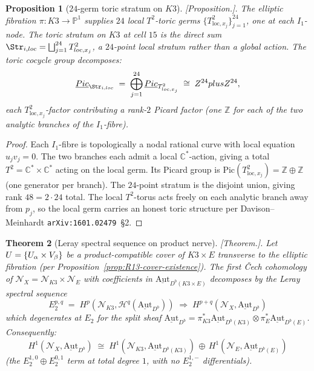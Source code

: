 \documentclass[11pt]{amsart}
\newtheorem{theorem}{Theorem}[section]
\newtheorem{proposition}[theorem]{Proposition}
\providecommand{\C}{\mathbb{C}}
\providecommand{\Z}{\mathbb{Z}}
\providecommand{\Aut}{\mathrm{Aut}}
\providecommand{\Pic}{\mathrm{Pic}}
\providecommand{\cN}{\mathcal{N}}
\providecommand{\cH}{\mathcal{H}}
\providecommand{\ClaimStatusProposition}{[\emph{Proposition.}]}
\providecommand{\ClaimStatusTheorem}{[\emph{Theorem.}]}
\begin{document}
\begin{proposition}[$24$-germ toric stratum on $K3$]
\label{prop:R13-24-germ-stratum}
\ClaimStatusProposition.
The elliptic fibration $\pi: K3 \to \mathbb{P}^1$ supplies $24$ local
$T^2$-toric germs $\{T^2_{\mathrm{loc}, x_j}\}_{j=1}^{24}$, one at each
$I_1$-node. The toric stratum on $K3$ at cell $15$ is the direct sum
$\Str_{i, \mathrm{loc}} = \bigsqcup_{j=1}^{24} T^2_{\mathrm{loc}, x_j}$,
a $24$-point local stratum rather than a global action. The toric
cocycle group decomposes:
\[
  \underline{\Pic}_{\Str_{i, \mathrm{loc}}}
  \;=\; \bigoplus_{j=1}^{24}
  \underline{\Pic}_{T^2_{\mathrm{loc}, x_j}}
  \;\cong\; \Z^{24} \oplus \Z^{24},
\]
each $T^2_{\mathrm{loc}, x_j}$-factor contributing a rank-$2$
Picard factor (one $\Z$ for each of the two analytic branches of
the $I_1$-fibre).
\end{proposition}

\begin{proof}
Each $I_1$-fibre is topologically a nodal rational curve with local
equation $u_j v_j = 0$. The two branches each admit a local
$\C^*$-action, giving a total $T^2 = \C^* \times \C^*$ acting on the
local germ. Its Picard group is $\Pic(T^2_{\mathrm{loc}, x_j})
= \Z \oplus \Z$ (one generator per branch). The $24$-point stratum is
the disjoint union, giving rank $48 = 2 \cdot 24$ total. The local
$T^2$-torus acts freely on each analytic branch away from $p_j$, so
the local germ carries an honest toric structure per
Davison--Meinhardt \texttt{arXiv:1601.02479}~\S 2.
\end{proof}

\begin{theorem}[Leray spectral sequence on product nerve]
\label{thm:R13-leray-ss}
\ClaimStatusTheorem.
Let $U = \{U_\alpha \times V_\beta\}$ be a product-compatible cover
of $K3 \times E$ transverse to the elliptic fibration (per
Proposition~\ref{prop:R13-cover-existence}). The first \v{C}ech
cohomology of $\cN_X = \cN_{K3} \times \cN_E$ with coefficients in
$\underline{\Aut}_{D^b(K3 \times E)}$ decomposes by the Leray spectral
sequence
\[
  E_2^{p, q} \;=\; H^p(\cN_{K3}, \cH^q(\underline{\Aut}_{D^b}))
  \;\Rightarrow\; H^{p+q}(\cN_X, \underline{\Aut}_{D^b})
\]
which degenerates at $E_2$ for the split sheaf
$\underline{\Aut}_{D^b} = \pi_{K3}^* \underline{\Aut}_{D^b(K3)}
\otimes \pi_E^* \underline{\Aut}_{D^b(E)}$. Consequently:
\[
  H^1(\cN_X, \underline{\Aut}_{D^b}) \;\cong\;
  H^1(\cN_{K3}, \underline{\Aut}_{D^b(K3)})
  \,\oplus\,
  H^1(\cN_E, \underline{\Aut}_{D^b(E)})
\]
(the $E_2^{1,0} \oplus E_2^{0,1}$ term at total degree $1$, with no
$E_2^{1, -}$ differentials).
\end{theorem}
\end{document}
